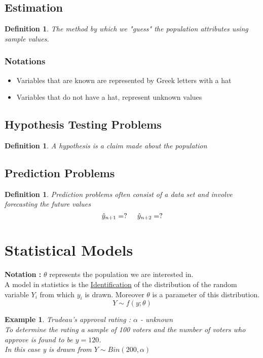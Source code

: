 \documentclass{article}
\newtheorem{ex}[theorem]{Example}
\newtheorem{definition}[theorem]{Definition}
\begin{document}
\subsection{Estimation}

\begin{definition} The method by which we "guess" the population attributes using sample values. 
\end{definition}

\subsubsection*{Notations}
\begin{itemize}
\item Variables that are known are represented by Greek letters with a hat 
\item Variables that do not have a hat, represent unknown values 
\end{itemize}

\subsection{Hypothesis Testing Problems}
\begin{definition} A hypothesis is a claim made about the population 
\end{definition}


\subsection{Prediction Problems}
\begin{definition}
Prediction problems often consist of a data set and involve forecasting the future values 
$$ \hat{y}_{n+1} = ? \hspace{0.5cm} \hat{y}_{n+2} = ? $$
\end{definition}

\section{Statistical Models}
\textbf{Notation : }\(\theta\) represents  the population we are interested in. \\

A model in statistics is the \underline{Identification} of the distribution of the random variable \(Y_i\) from which \(y_i\) is drawn. Moreover \(\theta\) is a parameter of this distribution.
$$ Y \sim f(y ; \theta)$$

\begin{ex}
Trudeau's approval rating : \(\alpha\) - unknown \\

To determine the rating a sample of 100 voters and the number of voters who approve is found to be \(y = 120\).\\
In this case y is drawn from  \(Y \sim Bin(200, \alpha)\) 
\end{ex}
\end{document}

